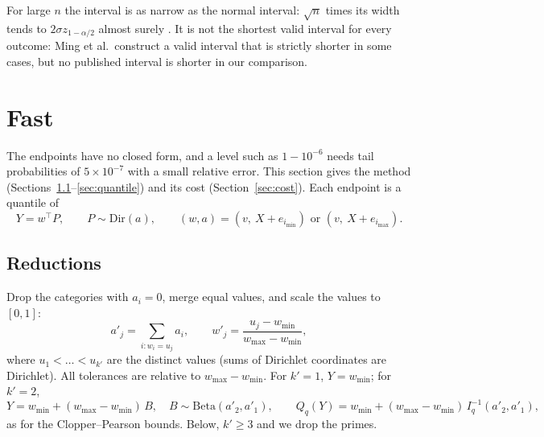 \documentclass[11pt]{article}
\newcommand{\Dir}{\mathrm{Dir}}
\newcommand{\Beta}{\mathrm{Beta}}
\begin{document}
For large $n$ the interval is as narrow as the normal interval: $\sqrt n$ times its width tends to $2\sigma z_{1-\alpha/2}$ almost surely \cite{ming2026}.
It is not the shortest valid interval for every outcome: Ming et al.\ construct a valid interval that is strictly shorter in some cases, but no published interval is shorter in our comparison.

\begin{table}[h]
\centering
\small

\caption{Coverage and mean expected width, $v = (0, \frac12, 1)$, $\alpha = 0.05$ (nominal coverage $0.95$). Wald: mean $\pm z\,\hat\sigma/\sqrt n$; Hoeffding \cite{hoeffding1963}; empirical Bernstein \cite{maurer2009}; Anderson: the one-sided DKW band on the empirical distribution function \cite{anderson1969}; profile likelihood with the $\chi^2_1$ cutoff; Bayes: equal-tail credible interval with the prior $\Dir(\frac12, \dots, \frac12)$. $^{*}$The betting interval depends on the order of the trials; its coverage is averaged over $8$ random orders, and computed on a grid of step $10^{-3}$.}
\label{tab:coverage}
\end{table}

\section{Fast}\label{sec:fast}

The endpoints have no closed form, and a level such as $1 - 10^{-6}$ needs tail probabilities of $5 \times 10^{-7}$ with a small relative error.
This section gives the method (Sections~\ref{sec:red}--\ref{sec:quantile}) and its cost (Section~\ref{sec:cost}).
Each endpoint is a quantile of
\[
  Y = w^\top P, \qquad P \sim \Dir(a), \qquad (w, a) = (v,\ X + e_{i_{\min}}) \text{ or } (v,\ X + e_{i_{\max}}).
\]

\subsection{Reductions}\label{sec:red}

Drop the categories with $a_i = 0$, merge equal values, and scale the values to $[0, 1]$:
\[
  a'_j = \sum_{i : w_i = u_j} a_i, \qquad w'_j = \frac{u_j - w_{\min}}{w_{\max} - w_{\min}},
\]
where $u_1 < \dots < u_{k'}$ are the distinct values (sums of Dirichlet coordinates are Dirichlet).
All tolerances are relative to $w_{\max} - w_{\min}$.
For $k' = 1$, $Y = w_{\min}$; for $k' = 2$,
\[
  Y = w_{\min} + (w_{\max} - w_{\min})\, B, \quad B \sim \Beta(a'_2, a'_1), \qquad
  Q_q(Y) = w_{\min} + (w_{\max} - w_{\min})\, I^{-1}_q(a'_2, a'_1),
\]
as for the Clopper--Pearson bounds.
Below, $k' \ge 3$ and we drop the primes.
\end{document}
